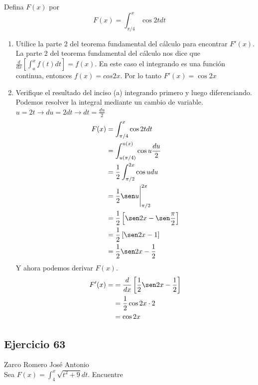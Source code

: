 \documentclass[12pt]{article}
\begin{document}
Defina $F (x)$ por
\[
F(x)=\int_{\pi/4}^{x} \cos{2t} dt
\]
\begin{enumerate}[label=(\alph*)]
\item Utilice la parte 2 del teorema fundamental del cálculo para encontrar $F'(x)$. \\
  La parte 2 del teorema fundamental del cálculo nos dice que $\frac{d}{dx}\left[ \int_{a}^{x} f(t)dt \right] = f(x)$. En este caso el integrando es una función continua, entonces $f(x) = cos2x$. Por lo tanto $F'(x) = \cos{2x}$
\item Verifique el resultado del inciso (a) integrando primero y luego diferenciando. \\
Podemos resolver la integral mediante un cambio de variable. $u= 2t \rightarrow du = 2dt  \rightarrow dt = \frac{du}{2}$\\
\begin{align*}
  F(x)
  & = \int_{\pi/4}^{x} \cos{2t} dt \\
  & = \int_{u(\pi/4)}^{u(x)} \cos{u} \frac{du}{2}\\
  & = \frac{1}{2} \int_{\pi/2}^{2x} \cos{u} du \\
  & = \frac{1}{2} \sen u \Bigg|_{\pi/2}^{2x} \\
  & = \frac{1}{2} \left[  \sen 2x - \sen \frac{\pi}{2} \right] \\
  & = \frac{1}{2} \left[  \sen 2x - 1 \right]\\
  & = \frac{1}{2}  \sen 2x - \frac{1}{2}  
\end{align*}
Y ahora podemos derivar $F(x)$.
\begin{align*}
  F'(x)=
  & = \frac{d}{dx} \left[ \frac{1}{2}  \sen 2x - \frac{1}{2} \right]  \\
  & = \frac{1}{2}  \cos 2x \cdot 2 \\
  & = \cos 2x  \\
\end{align*}
\end{enumerate}

\subsection{Ejercicio 63} Zarco Romero José Antonio \\

Sea $F(x)=\int_{4}^{x} \sqrt{t^2+9}dt$. Encuentre
\end{document}
